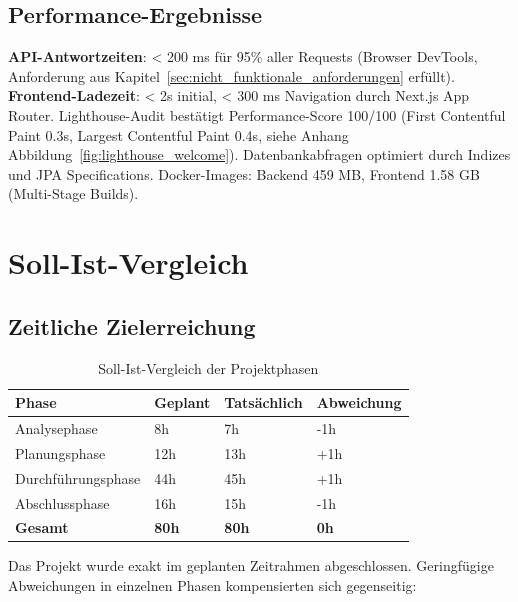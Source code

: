 \subsection{Performance-Ergebnisse}

\textbf{API-Antwortzeiten}: < 200 ms für 95\% aller Requests (Browser DevTools, Anforderung aus Kapitel~\ref{sec:nicht_funktionale_anforderungen} erfüllt). \textbf{Frontend-Ladezeit}: < 2s initial, < 300 ms Navigation durch Next.js\cite{nextjs_docs} App Router. Lighthouse\cite{lighthouse_docs}-Audit bestätigt Performance-Score 100/100 (First Contentful Paint 0.3s, Largest Contentful Paint 0.4s, siehe Anhang Abbildung~\ref{fig:lighthouse_welcome}). Datenbankabfragen optimiert durch Indizes und JPA Specifications\cite{spring_data_jpa}. Docker-Images: Backend 459 MB, Frontend 1.58 GB (Multi-Stage Builds\cite{docker_multistage}).

\section{Soll-Ist-Vergleich}

\subsection{Zeitliche Zielerreichung}

\begin{table}[H]
\centering
\footnotesize
{}
\begin{tabularx}{\textwidth}{|X|p{2cm}|p{2cm}|p{1.8cm}|}
\hline
\rowcolor{EDAGDunkelgrau!10}
\textbf{Phase} & \textbf{Geplant} & \textbf{Tatsächlich} & \textbf{Abweichung} \\
\hline
Analysephase & 8h & 7h & -1h \\
\hline
Planungsphase & 12h & 13h & +1h \\
\hline
Durchführungsphase & 44h & 45h & +1h \\
\hline
Abschlussphase & 16h & 15h & -1h \\
\hline
\rowcolor{EDAGDunkelgrau!30}
\textbf{Gesamt} & \textbf{80h} & \textbf{80h} & \textbf{0h} \\
\hline
\end{tabularx}
\caption{Soll-Ist-Vergleich der Projektphasen}
\label{tab:soll_ist_zeit}
\end{table}

Das Projekt wurde exakt im geplanten Zeitrahmen abgeschlossen. Geringfügige Abweichungen in einzelnen Phasen kompensierten sich gegenseitig:


